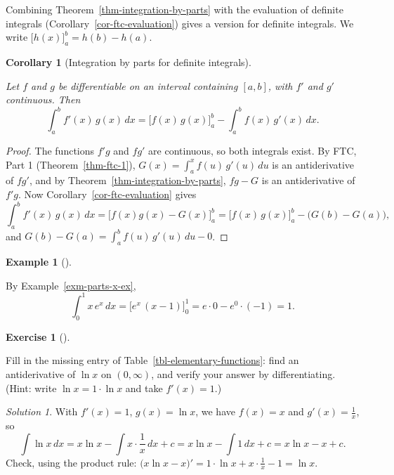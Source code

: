 \documentclass[
  letterpaper,
  DIV=11,
  numbers=noendperiod]{scrreprt}
\theoremstyle{plain}
\theoremstyle{plain}
\theoremstyle{definition}
\theoremstyle{definition}
\newtheorem{exercise}{Exercise}[chapter]
\theoremstyle{definition}
\newtheorem{example}{Example}[chapter]
\theoremstyle{plain}
\theoremstyle{plain}
\newtheorem{corollary}{Corollary}[chapter]
\theoremstyle{remark}
\newtheorem*{solution}{Solution}
\begin{document}
Combining Theorem~\ref{thm-integration-by-parts} with the evaluation of
definite integrals (Corollary~\ref{cor-ftc-evaluation}) gives a version
for definite integrals. We write \(\big[h(x)\big]_a^b = h(b)-h(a)\).

\begin{corollary}[Integration by parts for definite
integrals]\protect\hypertarget{cor-integration-by-parts-definite}{}\label{cor-integration-by-parts-definite}

Let \(f\) and \(g\) be differentiable on an interval containing
\([a,b]\), with \(f'\) and \(g'\) continuous. Then \[
\int_a^b f'(x)\,g(x)\,dx = \Big[f(x)\,g(x)\Big]_a^b - \int_a^b f(x)\,g'(x)\,dx .
\]

\end{corollary}

\begin{proof}
The functions \(f'g\) and \(fg'\) are continuous, so both integrals
exist. By FTC, Part 1 (Theorem~\ref{thm-ftc-1}),
\(G(x) = \int_a^x f(u)\,g'(u)\,du\) is an antiderivative of \(fg'\), and
by Theorem~\ref{thm-integration-by-parts}, \(fg-G\) is an antiderivative
of \(f'g\). Now Corollary~\ref{cor-ftc-evaluation} gives \[
\int_a^b f'(x)\,g(x)\,dx = \Big[f(x)g(x) - G(x)\Big]_a^b
= \Big[f(x)\,g(x)\Big]_a^b - \big(G(b)-G(a)\big),
\] and \(G(b)-G(a) = \int_a^b f(u)\,g'(u)\,du - 0\).
\end{proof}

\begin{example}[]\protect\hypertarget{exm-parts-definite}{}\label{exm-parts-definite}

\hfill\break
By Example~\ref{exm-parts-x-ex}, \[
\int_0^1 x\,e^x\,dx = \Big[e^x\,(x-1)\Big]_0^1 = e\cdot 0 - e^0\cdot(-1) = 1 .
\]

\end{example}

\begin{exercise}[]\protect\hypertarget{exr-parts-ln}{}\label{exr-parts-ln}

Fill in the missing entry of Table~\ref{tbl-elementary-functions}: find
an antiderivative of \(\ln x\) on \((0,\infty)\), and verify your answer
by differentiating. (Hint: write \(\ln x = 1\cdot\ln x\) and take
\(f'(x)=1\).)

\end{exercise}

\begin{solution}
With \(f'(x)=1\), \(g(x)=\ln x\), we have \(f(x)=x\) and
\(g'(x)=\frac1x\), so \[
\int \ln x\,dx = x\ln x - \int x\cdot\frac1x\,dx + c = x\ln x - \int 1\,dx + c = x\ln x - x + c .
\] Check, using the product rule:
\(\big(x\ln x - x\big)' = 1\cdot\ln x + x\cdot\frac1x - 1 = \ln x\).
\end{solution}
\end{document}
